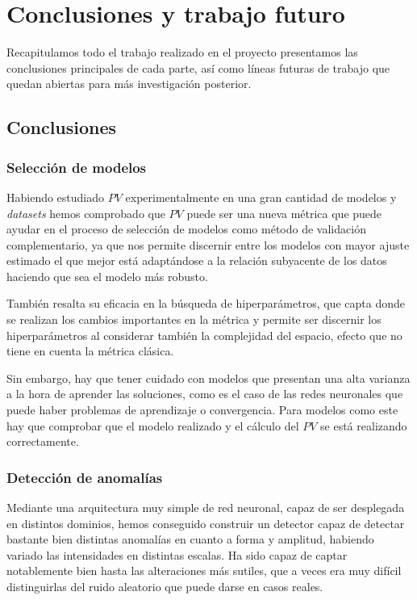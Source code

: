 
\chapter{Conclusiones y trabajo futuro}\label{ch:conclusiones-trabajo}

Recapitulamos todo el trabajo realizado en el proyecto presentamos las conclusiones principales de cada parte, así como líneas futuras de trabajo que quedan abiertas para más investigación posterior.

\section{Conclusiones}

\subsection{Selección de modelos}

Habiendo estudiado $PV$ experimentalmente en una gran cantidad de modelos y \emph{datasets} hemos comprobado que $PV$ puede ser una nueva métrica que puede ayudar en el proceso de selección de modelos como método de validación complementario, ya que nos permite discernir entre los modelos con mayor ajuste estimado el que mejor está adaptándose a la relación subyacente de los datos haciendo que sea el modelo más robusto.

También resalta su eficacia en la búsqueda de hiperparámetros, que capta donde se realizan los cambios importantes en la métrica y permite ser discernir los hiperparámetros al considerar también la complejidad del espacio, efecto que no tiene en cuenta la métrica clásica.

Sin embargo, hay que tener cuidado con modelos que presentan una alta varianza a la hora de aprender las soluciones, como es el caso de las redes neuronales que puede haber problemas de aprendizaje o convergencia. Para modelos como este hay que comprobar que el modelo realizado y el cálculo del $PV$ se está realizando correctamente.

\subsection{Detección de anomalías}

Mediante una arquitectura muy simple de red neuronal, capaz de ser desplegada en distintos dominios, hemos conseguido construir un detector capaz de detectar bastante bien distintas anomalías en cuanto a forma y amplitud, habiendo variado las intensidades en distintas escalas. Ha sido capaz de captar notablemente bien hasta las alteraciones más sutiles, que a veces era muy difícil distinguirlas del ruido aleatorio que puede darse en casos reales.


